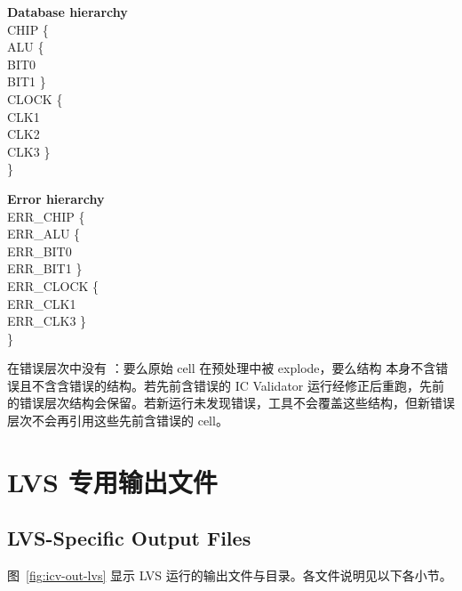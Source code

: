\begin{center}
\small
\begin{minipage}[t]{0.45\textwidth}
\textbf{Database hierarchy}\\[0.4em]
\ttfamily
CHIP \{\\
\hphantom{xx}ALU \{\\
\hphantom{xxxx}BIT0\\
\hphantom{xxxx}BIT1 \}\\
\hphantom{xx}CLOCK \{\\
\hphantom{xxxx}CLK1\\
\hphantom{xxxx}CLK2\\
\hphantom{xxxx}CLK3 \}\\
\}
\end{minipage}
\hfill
\begin{minipage}[t]{0.45\textwidth}
\textbf{Error hierarchy}\\[0.4em]
\ttfamily
ERR\_CHIP \{\\
\hphantom{xx}ERR\_ALU \{\\
\hphantom{xxxx}ERR\_BIT0\\
\hphantom{xxxx}ERR\_BIT1 \}\\
\hphantom{xx}ERR\_CLOCK \{\\
\hphantom{xxxx}ERR\_CLK1\\
\hphantom{xxxx}ERR\_CLK3 \}\\
\}
\end{minipage}
\end{center}

在错误层次中没有 ：要么原始  cell 在预处理中被 explode，要么结构  本身不含错误且不含含错误的结构。若先前含错误的 IC Validator 运行经修正后重跑，先前的错误层次结构会保留。若新运行未发现错误，工具不会覆盖这些结构，但新错误层次不会再引用这些先前含错误的 cell。

\section{LVS 专用输出文件}
\subsection*{LVS-Specific Output Files}

图~\ref{fig:icv-out-lvs} 显示 LVS 运行的输出文件与目录。各文件说明见以下各小节。


